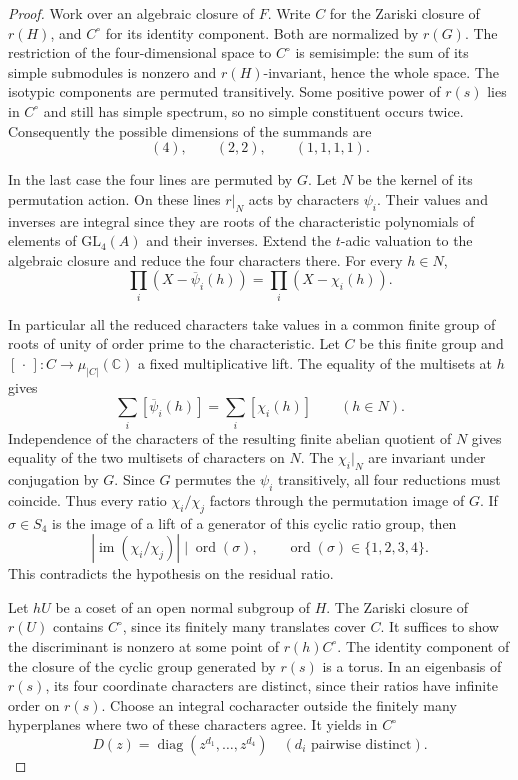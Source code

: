 \begin{proof}
Work over an algebraic closure of \(F\). Write \(C\) for the
Zariski closure of \(r(H)\), and \(C^\circ\) for its identity
component. Both are normalized by \(r(G)\). The restriction of
the four-dimensional space to \(C^\circ\) is semisimple: the sum
of its simple submodules is nonzero and \(r(H)\)-invariant, hence
the whole space. The isotypic components are permuted transitively.
Some positive power of \(r(s)\) lies in \(C^\circ\) and still has
simple spectrum, so no simple constituent occurs twice.
Consequently the possible dimensions of the summands are
\[
             (4),\qquad(2,2),\qquad(1,1,1,1).
\]

In the last case the four lines are permuted by \(G\). Let
\(N\) be the kernel of its permutation action. On these lines
\(r|_N\) acts by characters \(\psi_i\). Their values and inverses
are integral since they are roots of the characteristic
polynomials of elements of \(\mathrm{GL}_4(A)\) and their inverses.
Extend the \(t\)-adic valuation to the algebraic closure and
reduce the four characters there. For every \(h\in N\),
\[
 \prod_i(X-\overline\psi_i(h))=\prod_i(X-\chi_i(h)).
\]

In particular all the reduced characters take values in a common
finite group of roots of unity of order prime to the characteristic.
Let \(C\) be this finite group and \([\,\cdot\,]:C\to\mu_{|C|}(\mathbb C)\)
a fixed multiplicative lift. The equality of the multisets at \(h\) gives
\[
       \sum_i[\overline\psi_i(h)]=\sum_i[\chi_i(h)]\qquad(h\in N).
\] Independence of the
characters of the resulting finite abelian quotient of \(N\) gives
equality of the two multisets of characters on \(N\). The
\(\chi_i|_N\) are invariant under conjugation by \(G\). Since \(G\)
permutes the \(\psi_i\) transitively, all four reductions must
coincide. Thus every ratio \(\chi_i/\chi_j\) factors through the permutation image of \(G\). If \(\sigma\in S_4\) is the image
of a lift of a generator of this cyclic ratio group, then
\[
  |\operatorname{im}(\chi_i/\chi_j)|\mid\operatorname{ord}(\sigma),
          \qquad \operatorname{ord}(\sigma)\in\{1,2,3,4\}.
\] This contradicts the hypothesis on the residual ratio.

Let \(hU\) be a coset of an open normal subgroup of \(H\). The
Zariski closure of \(r(U)\) contains \(C^\circ\), since its finitely
many translates cover \(C\). It suffices to show the discriminant is
nonzero at some point of \(r(h)C^\circ\). The identity component of
the closure of the cyclic group generated by \(r(s)\) is a torus.
In an eigenbasis of \(r(s)\), its four coordinate characters are
distinct, since their ratios have infinite order on \(r(s)\). Choose
an integral cocharacter outside the finitely many hyperplanes where
two of these characters agree. It yields in \(C^\circ\)
\[
             D(z)=\operatorname{diag}(z^{d_1},\ldots,z^{d_4})
             \quad(d_i\text{ pairwise distinct}).
\]


\end{proof}

